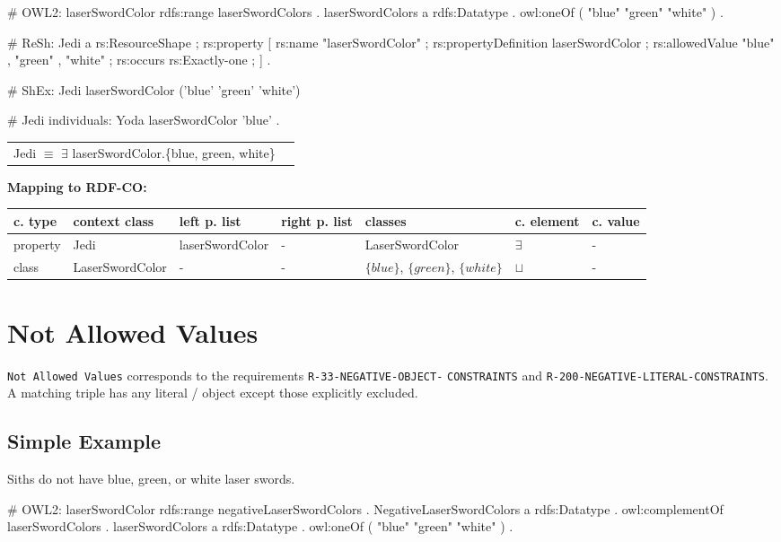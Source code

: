 \documentclass{llncs}
\newcommand{\ms}[1]{\texttt{#1}}
\newenvironment{gcotable}{
  \scriptsize
  \sffamily
  \vspace{0cm}
	\begin{center}
	\textbf{\vspace{0.4cm}Mapping to RDF-CO:} \\
  \begin{tabular}{l|l|l|l|l|l|l}
	\hline
  \textbf{c. type} & \textbf{context class} & \textbf{left p. list} & \textbf{right p. list} & \textbf{classes} & \textbf{c. element} & \textbf{c. value} \\
  \hline

}{
  \hline
  \end{tabular}
	\end{center}
}
\newenvironment{DL}{
  \vspace{0cm}
	\begin{center}
  \begin{tabular}{r l}

}{
  \end{tabular}
	\end{center}
}
\begin{document}
\begin{ex}
# OWL2:
laserSwordColor rdfs:range laserSwordColors . 
laserSwordColors
    a rdfs:Datatype .
    owl:oneOf ( "blue" "green" "white" ) .
\end{ex}

\begin{ex}
# ReSh:
Jedi a rs:ResourceShape ;
    rs:property [
        rs:name "laserSwordColor" ;
        rs:propertyDefinition laserSwordColor ;
        rs:allowedValue "blue" , "green" , "white" ;
        rs:occurs rs:Exactly-one ; ] .
\end{ex}

\begin{ex}
# ShEx:
Jedi {
    laserSwordColor ('blue' 'green' 'white') }
\end{ex}

\begin{ex}
# Jedi individuals:
Yoda 
    laserSwordColor 'blue' .
\end{ex}

\begin{DL}
Jedi $\equiv$ $\exists$ laserSwordColor.\{blue, green, white\} \\
\end{DL}

\begin{gcotable}
property & Jedi & laserSwordColor & - & LaserSwordColor & $\exists$ & - \\
class & LaserSwordColor & - & - & $\{blue\}$, $\{green\}$, $\{white\}$ & $\sqcup$ & - \\
\end{gcotable}

\section{Not Allowed Values}

\ms{Not Allowed Values} corresponds to the requirements
\ms{R-33-NEGATIVE-OBJECT-} \ms{CONSTRAINTS} and
\ms{R-200-NEGATIVE-LITERAL-CONSTRAINTS}.
A matching triple has any literal / object except those explicitly excluded.

\subsection{Simple Example}

Siths do not have blue, green, or white laser swords.

\begin{ex}
# OWL2:
laserSwordColor rdfs:range negativeLaserSwordColors . 
NegativeLaserSwordColors
    a rdfs:Datatype .
    owl:complementOf laserSwordColors .
laserSwordColors
    a rdfs:Datatype .
    owl:oneOf ( "blue" "green" "white" ) .
\end{ex}
\end{document}
